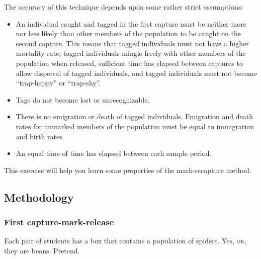\documentclass[12pt, hidelinks]{exam}
\begin{document}
The accuracy of this technique depends upon some
rather strict assumptions:

\begin{itemize}[label=\color{black}\textbullet]

\item
  An individual caught and tagged in the first capture must be neither
  more nor less likely than other members of the population to be caught
  on the second capture. This means that tagged individuals must not
  have a higher mortality rate, tagged individuals mingle freely with
  other members of the population when released, sufficient time has
  elapsed between captures to allow dispersal of tagged individuals, and
  tagged individuals must not become ``trap-happy'' or ``trap-shy''.

\item
  Tags do not become lost or unrecognizable.

\item
  There is no emigration or death of tagged individuals. Emigration and
  death rates for unmarked members of the population must be equal to
  immigration and birth rates.
  
  \item An equal time  of time has elapsed between each sample period.

\end{itemize}

This exercise will help you learn some properties of the mark-recapture method.

\subsection*{Methodology}

\subsubsection*{First capture-mark-release}\label{sec:first_mark}

Each pair of students has a box that contains a population of spiders. %
Yes, \textsc{ok}, they are beans. Pretend. %
\end{document}
